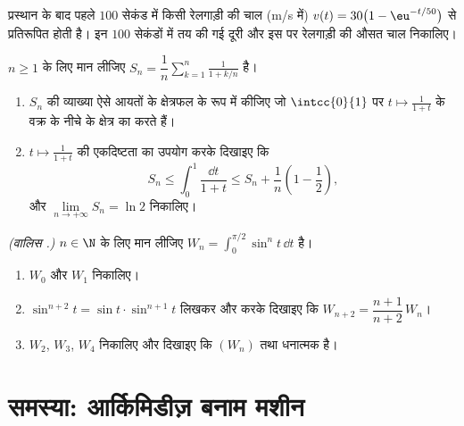 \begin{exercise}[$\star\star$]\label{exo:g12:integ:7}
प्रस्थान के बाद पहले $100$ सेकंड में किसी रेलगाड़ी की चाल (m/s में) $v(t) = 30\bigl(1 - \eu^{-t/50}\bigr)$ से
प्रतिरूपित होती है। इन $100$ सेकंडों में तय की गई दूरी और इस  पर
रेलगाड़ी की औसत चाल निकालिए।
\end{exercise}

\begin{exercise}[$\star\star\star$]\label{exo:g12:integ:8}
$n \geq 1$ के लिए मान लीजिए $S_n = \dfrac1n \displaystyle\sum_{k=1}^{n} \frac{1}{1 + k/n}$ है।
\begin{enumerate}
  \item $S_n$ की व्याख्या ऐसे आयतों के क्षेत्रफल के रूप में कीजिए जो $\intcc{0}{1}$
        पर $t \mapsto \frac{1}{1+t}$ के वक्र के नीचे के क्षेत्र का  करते हैं।
  \item $t \mapsto \frac{1}{1+t}$ की एकदिष्टता का उपयोग करके दिखाइए कि
        \[
        S_n \leq \int_0^1 \frac{\dd t}{1+t} \leq S_n + \frac1n\left(1 - \frac12\right),
        \]
        और $\lim\limits_{n\to+\infty} S_n = \ln 2$ निकालिए।
\end{enumerate}
\end{exercise}

\begin{exercise}[$\star\star\star$]\label{exo:g12:integ:9}
\emph{(वालिस .)} $n \in \N$ के लिए मान लीजिए $W_n = \displaystyle\int_0^{\pi/2} \sin^n t\,\dd t$ है।
\begin{enumerate}
  \item $W_0$ और $W_1$ निकालिए।
  \item $\sin^{n+2}t = \sin t \cdot \sin^{n+1} t$ लिखकर और  करके दिखाइए कि $W_{n+2} = \dfrac{n+1}{n+2}\,W_n$।
  \item $W_2$, $W_3$, $W_4$ निकालिए और दिखाइए कि $(W_n)$  तथा धनात्मक
        है।
\end{enumerate}
\end{exercise}

\section{समस्या: आर्किमिडीज़ बनाम मशीन}

